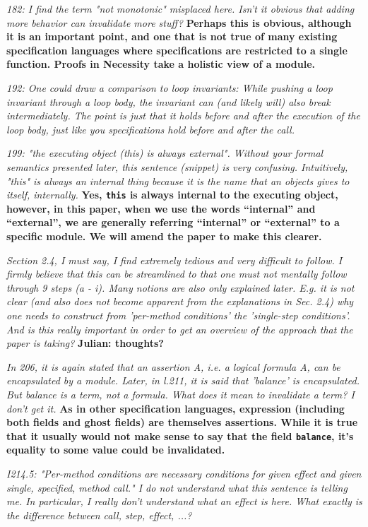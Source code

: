 \documentclass[11pt]{amsart}
\newcommand{\rev}[1]{\emph #1}
\newcommand{\us}[1]{\bf #1}
\begin{document}
{\rev {{182: I find the term "not monotonic" misplaced here. Isn't it obvious that adding more behavior can invalidate more stuff? }}}
{\us{Perhaps this is obvious, although it is an important point, and one that is not true of many existing specification languages where specifications are restricted to a single 
function. Proofs in Necessity take a holistic view of a module.}}

{\rev {{192: One could draw a comparison to loop invariants: While pushing a loop invariant through a loop body, the invariant can (and likely will) also break intermediately. The point is just that it holds before and after the execution of the loop body, just like you specifications hold before and after the call. }}}

{\rev {{199: "the executing object (this) is always external". Without your formal semantics presented later, this sentence (snippet) is very confusing. Intuitively, "this" is always an internal thing because it is the name that an objects gives to itself, internally. }}}
{\us{Yes, \texttt{this} is always internal to the executing object, however, in this paper, when we use the words ``internal'' and ``external'', we are generally referring ``internal'' or ``external'' to 
a specific module. We will amend the paper to make this clearer.}}

{\rev {{ Section 2.4, I must say, I find extremely tedious and very difficult to follow. I firmly believe that this can be streamlined to that one must not mentally follow through 9 steps (a - i). Many notions are also only explained later. E.g. it is not clear (and also does not become apparent from the explanations in Sec. 2.4) why one needs to construct from 'per-method conditions' the 'single-step conditions'. And is this really important in order to get an overview of the approach that the paper is taking? }}}
{\us{Julian: thoughts?}}

 {\rev {{  In 206, it is again stated that an assertion A, i.e. a logical formula A, can be encapsulated by a module. Later, in l.211, it is said that 'balance' is encapsulated. But balance is a term, not a formula. What does it mean to invalidate a term? I don't get it. }}}
 {\us{As in other specification languages, expression (including both fields and ghost fields) are themselves assertions. While it is true that it usually would 
 not make sense to say that the field \texttt{balance}, it's equality to some value could be invalidated.}}

{\rev {{I214.5: "Per-method conditions are necessary conditions for given effect and given single, specified, method call." I do not understand what this sentence is telling me. In particular, I really don't understand what an effect is here. What exactly is the difference between call, step, effect, ...? }}}
\end{document}
